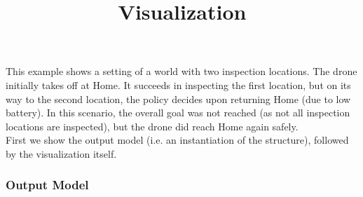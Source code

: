 \documentclass[12pt]{extarticle}
\begin{document}
\title{Visualization}
\date{}
\author{}
\maketitle
\noindent
This example shows a setting of a world with two inspection locations. The drone initially takes off at Home. It succeeds in inspecting the first location, but on its way to the second location, the policy decides upon returning Home (due to low battery). In this scenario, the overall goal was not reached (as not all inspection locations are inspected), but the drone did reach Home again safely.\\
First we show the output model (i.e. an instantiation of the structure), followed by the visualization itself.
\subsubsection*{Output Model}
\end{document}
